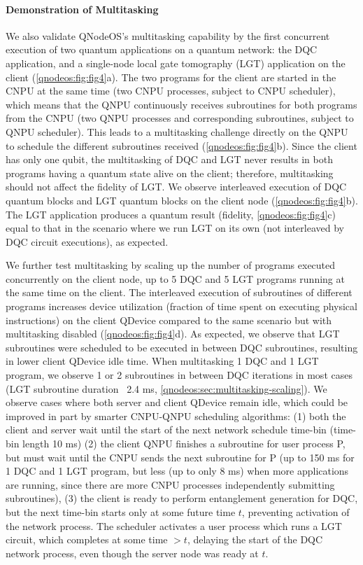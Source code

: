 \paragraph{Demonstration of Multitasking}
We also validate QNodeOS's multitasking capability by the first concurrent execution of two quantum applications on a quantum network: the DQC application, and a single-node local gate tomography (LGT) application on the client (\cref{qnodeos:fig:fig4}a).
The two programs for the client are started in the CNPU at the same time (two CNPU processes, subject to CNPU scheduler), which means that the QNPU continuously receives subroutines for both programs from the CNPU (two QNPU processes and corresponding subroutines, subject to QNPU scheduler).
This leads to a multitasking challenge directly on the QNPU to schedule the different subroutines received (\cref{qnodeos:fig:fig4}b).
Since the client has only one qubit, the multitasking of DQC and LGT never results in both programs having a quantum state alive on the client; therefore, multitasking should not affect the fidelity of LGT.
We observe interleaved execution of DQC quantum blocks and LGT quantum blocks on the client node (\cref{qnodeos:fig:fig4}b).
The LGT application produces a quantum result (fidelity, \cref{qnodeos:fig:fig4}c) equal to that in the scenario where we run LGT on its own (not interleaved by DQC circuit executions), as expected.

We further test multitasking by scaling up the number of programs executed concurrently on the client node, up to 5 DQC and 5 LGT programs running at the same time on the client.
The interleaved execution of subroutines of different programs increases device utilization (fraction of time spent on executing physical instructions) on the client QDevice compared to the same scenario but with multitasking disabled (\cref{qnodeos:fig:fig4}d).
As expected, we observe that LGT subroutines were scheduled to be executed in between DQC subroutines, resulting in lower client QDevice idle time.
When multitasking 1 DQC and 1 LGT program, we observe 1 or 2 subroutines in between DQC iterations in most cases (LGT subroutine duration ~2.4 ms, \cref{qnodeos:sec:multitasking-scaling}).
We observe cases where both server and client QDevice remain idle, which could be improved in part by smarter CNPU-QNPU scheduling algorithms: (1) both the client and server wait until the start of the next network schedule time-bin (time-bin length 10 ms) (2) the client QNPU finishes a subroutine for user process P, but must wait until the CNPU sends the next subroutine for P (up to 150 ms for 1 DQC and 1 LGT program, but less (up to only 8 ms) when more applications are running, since there are more CNPU processes independently submitting subroutines), (3) the client is ready to perform entanglement generation for DQC, but the next time-bin starts only at some future time $t$, preventing activation of the network process.
The scheduler activates a user process which runs a LGT circuit, which completes at some time $>t$, delaying the start of the DQC network process, even though the server node was ready at $t$.

